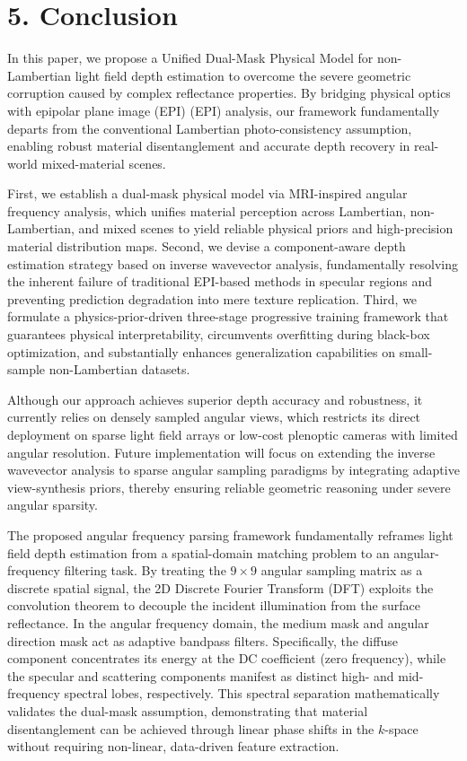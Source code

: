 \section{5. Conclusion}


In this paper, we propose a Unified Dual-Mask Physical Model for non-Lambertian light field depth estimation to overcome the severe geometric corruption caused by complex reflectance properties. By bridging physical optics with epipolar plane image (EPI) (EPI) analysis, our framework fundamentally departs from the conventional Lambertian photo-consistency assumption, enabling robust material disentanglement and accurate depth recovery in real-world mixed-material scenes. 

First, we establish a dual-mask physical model via MRI-inspired angular frequency analysis, which unifies material perception across Lambertian, non-Lambertian, and mixed scenes to yield reliable physical priors and high-precision material distribution maps. Second, we devise a component-aware depth estimation strategy based on inverse wavevector analysis, fundamentally resolving the inherent failure of traditional EPI-based methods in specular regions and preventing prediction degradation into mere texture replication. Third, we formulate a physics-prior-driven three-stage progressive training framework that guarantees physical interpretability, circumvents overfitting during black-box optimization, and substantially enhances generalization capabilities on small-sample non-Lambertian datasets. 

Although our approach achieves superior depth accuracy and robustness, it currently relies on densely sampled angular views, which restricts its direct deployment on sparse light field arrays or low-cost plenoptic cameras with limited angular resolution. Future implementation will focus on extending the inverse wavevector analysis to sparse angular sampling paradigms by integrating adaptive view-synthesis priors, thereby ensuring reliable geometric reasoning under severe angular sparsity.


The proposed angular frequency parsing framework fundamentally reframes light field depth estimation from a spatial-domain matching problem to an angular-frequency filtering task. By treating the $9 \times 9$ angular sampling matrix as a discrete spatial signal, the 2D Discrete Fourier Transform (DFT) exploits the convolution theorem to decouple the incident illumination from the surface reflectance. In the angular frequency domain, the medium mask and angular direction mask act as adaptive bandpass filters. Specifically, the diffuse component concentrates its energy at the DC coefficient (zero frequency), while the specular and scattering components manifest as distinct high- and mid-frequency spectral lobes, respectively. This spectral separation mathematically validates the dual-mask assumption, demonstrating that material disentanglement can be achieved through linear phase shifts in the $k$-space without requiring non-linear, data-driven feature extraction.

